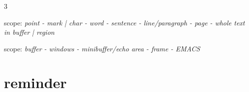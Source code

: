 \documentclass[11pt,landscape,a4paper]{article}
\begin{document}
\begin{multicols}{3}









\begin{center}
	scope: {\color{bblue}\emph{point - mark | char - word - sentence - line/paragraph - page - whole text in buffer | region}}
\end{center}

\begin{center}
	scope: {\color{bblue}\emph{buffer - windows - minibuffer/echo area - frame - EMACS}}
\end{center}





\columnbreak

\section{reminder}



\end{multicols}
\end{document}
